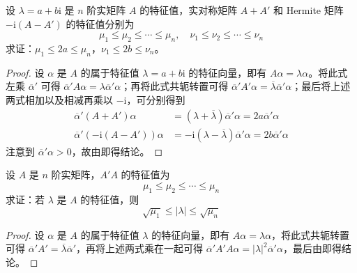 \documentclass[../../main.tex]{subfiles}
\begin{document}
\begin{example}\label{example:例9.54}
设 \(\lambda = a + b\mathrm{i}\) 是 \(n\) 阶实矩阵 \(A\) 的特征值，实对称矩阵 \(A + A'\) 和 Hermite 矩阵 \(-\mathrm{i}(A - A')\) 的特征值分别为
\[
\mu_1 \leqslant  \mu_2 \leqslant  \cdots \leqslant  \mu_n,\quad \nu_1 \leqslant  \nu_2 \leqslant  \cdots \leqslant  \nu_n
\]
求证：\(\mu_1 \leqslant  2a \leqslant  \mu_n\)，\(\nu_1 \leqslant  2b \leqslant  \nu_n\)。
\end{example}
\begin{proof}
设 \(\alpha\) 是 \(A\) 的属于特征值 \(\lambda = a + b\mathrm{i}\) 的特征向量，即有 \(A\alpha = \lambda\alpha\)。将此式左乘 \(\overline{\alpha}'\) 可得 \(\overline{\alpha}'A\alpha = \lambda\overline{\alpha}'\alpha\)；再将此式共轭转置可得 \(\overline{\alpha}'A'\alpha = \overline{\lambda}\overline{\alpha}'\alpha\)；最后将上述两式相加以及相减再乘以 \(-\mathrm{i}\)，可分别得到
\begin{align*}
\overline{\alpha}'(A + A')\alpha &= (\lambda + \overline{\lambda})\overline{\alpha}'\alpha = 2a\overline{\alpha}'\alpha\\
\overline{\alpha}'(-\mathrm{i}(A - A'))\alpha &= -\mathrm{i}(\lambda - \overline{\lambda})\overline{\alpha}'\alpha = 2b\overline{\alpha}'\alpha
\end{align*}
注意到 \(\overline{\alpha}'\alpha > 0\)，故由即得结论。 

\end{proof}

\begin{example}\label{example:例9.55}
设 \(A\) 是 \(n\) 阶实矩阵，\(A'A\) 的特征值为
\[
\mu_1 \leqslant  \mu_2 \leqslant  \cdots \leqslant  \mu_n
\]
求证：若 \(\lambda\) 是 \(A\) 的特征值，则
\[
\sqrt{\mu_1} \leqslant  |\lambda| \leqslant  \sqrt{\mu_n}
\]
\end{example}
\begin{proof}
设 \(\alpha\) 是 \(A\) 的属于特征值 \(\lambda\) 的特征向量，即有 \(A\alpha = \lambda\alpha\)，将此式共轭转置可得 \(\overline{\alpha}'A' = \overline{\lambda}\overline{\alpha}'\)，再将上述两式乘在一起可得 \(\overline{\alpha}'A'A\alpha = |\lambda|^2\overline{\alpha}'\alpha\)，最后由即得结论。 

\end{proof}
\end{document}
